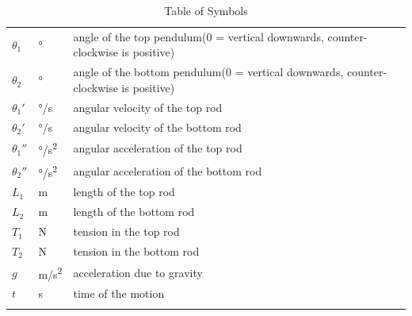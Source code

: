 \documentclass[12pt]{article}
\begin{document}
\begin{table}[H]
\begin{longtable*}{l l p{12cm}}
  \\
  $\theta_1$ & \si[per-mode=symbol] {\degree} & angle of the top pendulum(0 = vertical downwards, counter-clockwise is positive)
  \\
  $\theta_2$ & \si[per-mode=symbol] {\degree} & angle of the bottom pendulum(0 = vertical downwards, counter-clockwise is positive)
  \\ 
  ${\theta_1}'$ & \si[per-mode=symbol] {\degree\per\second} & angular velocity of the top rod
  \\
  ${\theta_2}'$ & \si[per-mode=symbol] {\degree\per\second} & angular velocity of the bottom rod
  \\
  ${\theta_1}''$ & \si[per-mode=symbol] {\degree\per\square\second} & angular acceleration of the top rod
  \\
  ${\theta_2}''$ & \si[per-mode=symbol] {\degree\per\square\second} & angular acceleration of the bottom rod
  \\
  $L_1$ & \si[per-mode=symbol] {\metre} & length of the top rod
  \\
  $L_2$ & \si[per-mode=symbol] {\metre} & length of the bottom rod
  \\
  $T_1$ & \si[per-mode=symbol] {\newton} & tension in the top rod
  \\
  $T_2$ & \si[per-mode=symbol] {\newton} & tension in the bottom rod
  \\
  $g$ & \si[per-mode=symbol] {\metre\per\square\second} & acceleration due to gravity
  \\
  $t$ &  \si[per-mode=symbol] {\second}  & time of the motion
  \\
  \bottomrule\\
  \end{longtable*}
  \caption{Table of Symbols} 
\end{table}
~\newline
\end{document}
